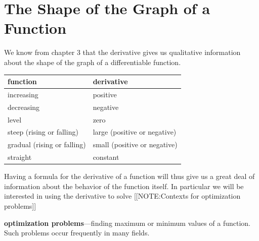 \section{The Shape of the Graph of a \mbox{Function}}
\label{sec:the-shape-of-the-graph-of-a-mboxfunction}

We know from chapter 3 that the derivative gives us qualitative
information about the shape of the graph of a differentiable function.


\begin{center}


\begin{tabular}{ll} 
function &  derivative \\ \hline
increasing  &  positive \\
decreasing  & negative \\
level &  zero \\
steep (rising or falling) & large (positive or negative) \\
gradual (rising or falling) \qquad & small (positive or negative) \\
straight & constant
\end{tabular}

\end{center}


Having a formula for the derivative of a function will thus give us a
great deal of information about the behavior of the function itself.
In particular we will be interested in using the derivative to solve
[[NOTE:Contexts for optimization problems]]	

{\bf optimization problems}---finding maximum or
minimum values of a function.  Such problems occur frequently in many
fields.

